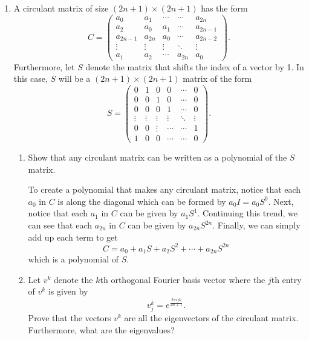 \documentclass[a4paper,12pt]{article}
\newcommand{\pmat}[1]{\begin{pmatrix} #1 \end{pmatrix}}
\begin{document}
\begin{enumerate}[label = (\arabic*)]
	\item A circulant matrix of size $ (2n + 1) \times (2n + 1) $ has the form
	\[
		C = 
		\pmat{
			a_0 & a_1 & \cdots & \cdots & a_{2n} \\
			a_{2}  & a_0 & a_1 & \cdots & a_{2n - 1} \\
			a_{2n - 1} & a_{2n} & a_0 & \cdots & a_{2n - 2} \\
			\vdots & \vdots & \vdots & \ddots & \vdots \\
			a_1 & a_2 & \cdots & a_{2n} & a_0
		}.
	\]
	Furthermore, let $ S $ denote the matrix that shifts the index of a vector by 1. In this case, $ S $ will be a $ (2n + 1) \times (2n + 1) $ matrix of the form
	\[
		S = 
		\pmat{
			0 & 1 & 0 & 0 & \cdots & 0 \\
			0 & 0 & 1 & 0 & \cdots & 0 \\
			0 & 0 & 0 & 1 & \cdots & 0 \\
			\vdots & \vdots & \vdots & \vdots & \ddots & \vdots \\
			0 & 0 & \vdots & \cdots & \cdots & 1 \\
			1 & 0 & 0 & \cdots & \cdots &  0
		}.
	\]
	\begin{enumerate}[label = (\alph*)]
		\item Show that any circulant matrix can be written as a polynomial of the $ S $ matrix.
		
		To create a polynomial that makes any circulant matrix, notice that each $ a_0 $ in $ C $ is along the diagonal which can be formed by $ a_0 I = a_0 S^0 $. Next, notice that each $ a_1 $ in $ C $ can be given by $ a_1 S^1 $. Continuing this trend, we can see that each $ a_{2n} $ in $ C $ can be given by $ a_{2n} S^{2n} $. Finally, we can simply add up each term to get
		\[
			C = a_0 + a_1 S + a_2 S^2 + \cdots + a_{2n} S^{2n}
		\]
		which is a polynomial of $ S $.
		
		\item Let $ v^k $ denote the $ k $th orthogonal Fourier basis vector where the $ j $th entry of $ v^k $ is given by
		\[
			v_j^k = e^{\frac{2\pi i j k}{2n + 1}}.
		\]
		Prove that the vectors $ v^k $ are all the eigenvectors of the circulant matrix. Furthermore, what are the eigenvalues?
		

\end{enumerate}
\end{enumerate}
\end{document}
